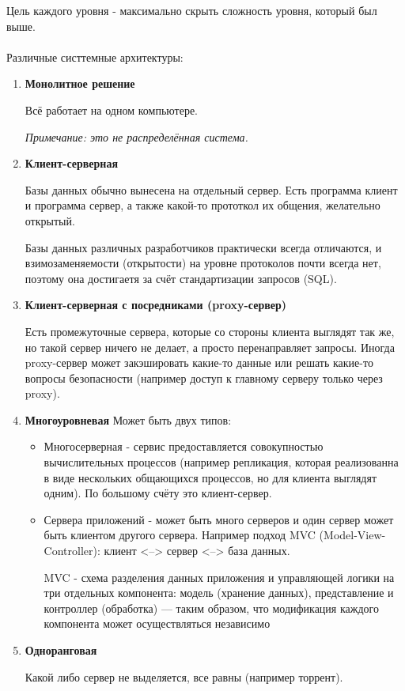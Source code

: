 Цель каждого уровня - максимально скрыть сложность уровня, который был выше.\\
\\
Различные систтемные архитектуры:
\begin{enumerate}
\item \textbf{ Монолитное решение}

Всё работает на одном компьютере.

\textit{ Примечание: это не распределённая система.}

\item \textbf{ Клиент-серверная}

Базы данных обычно вынесена на отдельный сервер. Есть программа клиент и программа сервер, а также какой-то прототкол их общения, желательно открытый.

Базы данных различных разработчиков практически всегда отличаются, и взимозаменяемости (открытости) на уровне протоколов почти всегда нет, поэтому она достигаетя за счёт стандартизации запросов (SQL).

\item \textbf{ Клиент-серверная с посредниками (proxy-сервер)}

Есть промежуточные сервера, которые со стороны клиента выглядят так же, но такой сервер ничего не делает, а просто перенаправляет запросы. Иногда proxy-сервер может закэшировать какие-то данные или решать какие-то вопросы безопасности (например доступ к главному серверу только через proxy).

\item \textbf{ Многоуровневая}
Может быть двух типов:
\begin{itemize}
\item
Многосерверная - сервис предоставляется совокупностью вычислительных процессов (например репликация, которая реализованна в виде нескольких общающихся процессов, но для клиента выглядят одним). По большому счёту это клиент-сервер.

\item
Сервера приложений - может быть много серверов и один сервер может быть клиентом другого сервера.
Например подход MVC (Model-View-Controller): клиент <--> сервер <--> база данных.

MVC - схема разделения данных приложения и управляющей логики на три отдельных компонента: модель (хранение данных), представление и контроллер (обработка) — таким образом, что модификация каждого компонента может осуществляться независимо

\end{itemize}

\item \textbf{ Одноранговая}

Какой либо сервер не выделяется, все равны (например торрент).
\end{enumerate}



















